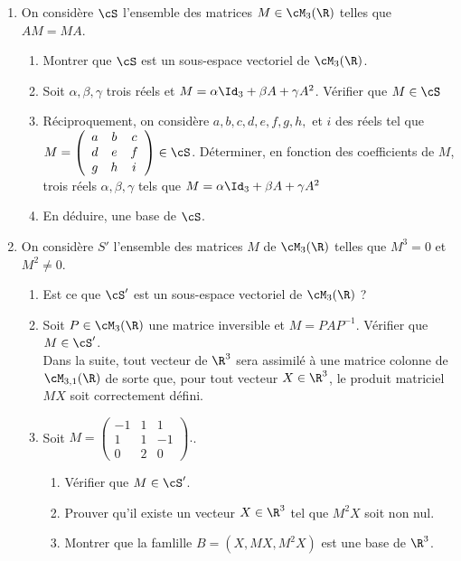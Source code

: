 \begin{exercice}
\begin{enumerate}
\item On considère $\cS$ l'ensemble des matrices  $M\in \cM_3(\R)$ telles que $AM=MA$. 
\begin{enumerate}
\item Montrer que $\cS$ est un sous-espace vectoriel de $\cM_3(\R)$. 
\item Soit $\alpha, \beta, \gamma $  trois réels et $M = \alpha \Id_3 +\beta A +\gamma A^2$. Vérifier que $M\in \cS$
\item Réciproquement, on considère $a, b, c, d, e, f, g, h, $ et $i$ des réels tel que $M =   \left(\begin{array}{ccc}
a&b&c\\
d&e&f\\
g&h&i
\end{array}
\right) \in \cS$. Déterminer, en fonction des coefficients de $M$, trois réels $\alpha, \beta, \gamma$ tels que $ M =\alpha \Id_3 +\beta A +\gamma A^2$
\item En déduire, une base de $\cS$. 
\end{enumerate} 
\item On considère $S'$ l'ensemble des matrices $M$ de $\cM_3(\R)$ telles que $M^3=0$  et $M^2 \neq 0$. 
\begin{enumerate}
\item Est ce que $\cS'$ est un sous-espace vectoriel de $\cM_3(\R)$ ?
\item Soit $P\in \cM_3(\R)$  une matrice inversible et $M=P A P^{-1} $. Vérifier que $M\in \cS'$.\\
Dans la suite, tout vecteur de $\R^3$ sera assimilé à une matrice colonne de $\cM_{3,1}(\R)$ de sorte que, pour tout vecteur $X\in \R^3$, le produit matriciel $MX$ soit correctement défini. 
\item Soit $M =\left( 
\begin{array}{ccc}
-1&1& 1\\
1&1&-1\\
0&2&0
\end{array}
\right).$.
\begin{enumerate}
\item  Vérifier que $M \in \cS'$. 
\item Prouver qu'il existe un vecteur $X\in \R^3$ tel que $M^2 X$ soit non nul.
\item Montrer que la famlille $B=(X,MX,M^2X) $ est une base de $\R^3$.
\end{enumerate}


\end{enumerate}
\end{enumerate}
\end{exercice}
\vspace{1cm}



